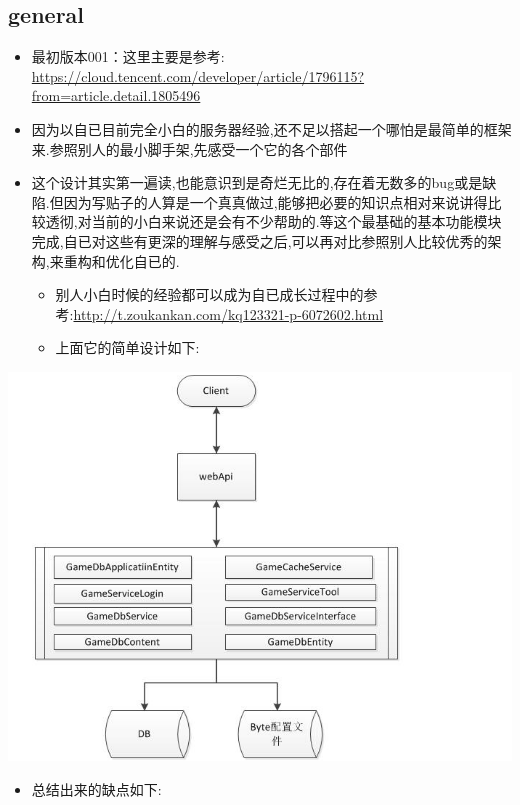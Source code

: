 \documentclass[9pt, b5paper]{article}
\begin{document}
\subsection{general}
\label{sec-4-2}
\begin{itemize}
\item 最初版本001：这里主要是参考:　\url{https://cloud.tencent.com/developer/article/1796115?from=article.detail.1805496}
\item 因为以自已目前完全小白的服务器经验,还不足以搭起一个哪怕是最简单的框架来.参照别人的最小脚手架,先感受一个它的各个部件
\item 这个设计其实第一遍读,也能意识到是奇烂无比的,存在着无数多的bug或是缺陷.但因为写贴子的人算是一个真真做过,能够把必要的知识点相对来说讲得比较透彻,对当前的小白来说还是会有不少帮助的.等这个最基础的基本功能模块完成,自已对这些有更深的理解与感受之后,可以再对比参照别人比较优秀的架构,来重构和优化自已的. 
\begin{itemize}
\item 别人小白时候的经验都可以成为自已成长过程中的参考:\url{http://t.zoukankan.com/kq123321-p-6072602.html}
\item 上面它的简单设计如下:
\end{itemize}
\end{itemize}

\includegraphics[width=.9\linewidth]{./pic/server_20230103_220701.png}
\begin{itemize}
\item 总结出来的缺点如下:
\end{itemize}
\end{document}
